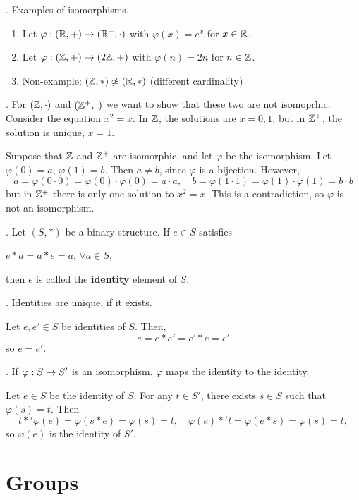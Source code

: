 \ex. Examples of isomorphisms.
\begin{enumerate}
    \item Let \(\varphi: (\mathbb{R}, +) \rightarrow (\mathbb{R}^+, \cdot)\) with \(\varphi(x) = e^x\) for \(x \in \mathbb{R}\).
    \item Let \(\varphi: (\mathbb{Z}, +) \rightarrow (2\mathbb{Z}, +)\) with \(\varphi(n) = 2n\) for \(n \in \mathbb{Z}\).
    \item Non-example: \((\mathbb{Z}, *) \not\simeq (\mathbb{R}, *)\) (different cardinality)
\end{enumerate}

\ex. For \((\mathbb{Z}, \cdot)\) and \((\mathbb{Z}^+, \cdot)\) we want to show that these two are not isomoprhic. Consider the equation \(x^2 = x\). In \(\mathbb{Z}\), the solutions are \(x = 0, 1\), but in \(\mathbb{Z}^+\), the solution is unique, \(x = 1\).

\pf Suppose that \(\mathbb{Z}\) and \(\mathbb{Z}^+\) are isomorphic, and let \(\varphi\) be the isomorphism. Let \(\varphi(0) = a\), \(\varphi(1) = b\). Then \(a \neq b\), since \(\varphi\) is a bijection. However,
\[
    a = \varphi(0 \cdot 0) = \varphi(0) \cdot \varphi(0) = a \cdot a, \quad
    b = \varphi(1 \cdot 1) = \varphi(1) \cdot \varphi(1) = b \cdot b
\]
but in \(\mathbb{Z}^+\) there is only one solution to \(x^2 = x\). This is a contradiction, so \(\varphi\) is not an isomorphism.

.  Let \((S, *)\) be a binary structure. If \(e \in S\) satisfies
\begin{center}
    \(e * a = a * e = a\), \quad \(\forall a \in S\),
\end{center}
then \(e\) is called the \textbf{identity} element of \(S\).

\thm. Identities are unique, if it exists.

\pf Let \(e, e' \in S\) be identities of \(S\). Then,
\[
    e = e * e' = e' * e = e'
\]
so \(e = e'\).

\thm. If \(\varphi: S \rightarrow S'\) is an isomorphism, \(\varphi\) maps the identity to the identity.

\pf Let \(e \in S\) be the identity of \(S\). For any \(t \in S'\), there exists \(s \in S\) such that \(\varphi(s) = t\). Then
\[
    t *' \varphi(e) = \varphi(s * e) = \varphi(s) = t, \quad
    \varphi(e) *' t = \varphi(e * s) = \varphi(s) = t,
\]
so \(\varphi(e)\) is the identity of \(S'\).

\chapter{Groups}

